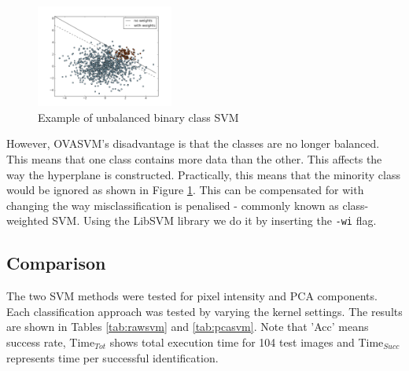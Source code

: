 \documentclass[10pt,twocolumn,letterpaper]{article}
\begin{document}
\begin{figure}[H]
\begin{center}
  
    \includegraphics[width=0.4\textwidth]{../results/SVM_unbalanced}

  \caption{Example of unbalanced binary class SVM \cite{SVM_unb}} \label{fig:SVM_un}
\end{center}
\end{figure}

However, OVASVM's disadvantage is that the classes are no longer balanced. This means that one class contains more data than the other. This affects the way the hyperplane is constructed. Practically, this means that the minority class would be ignored as shown in Figure \ref{fig:SVM_un}. This can be compensated for with changing the way misclassification is penalised - commonly known as class-weighted SVM. Using the LibSVM library we do it by inserting the {\tt\small -wi} flag.


\subsection{Comparison}

The two SVM methods were tested for pixel intensity and PCA components. Each classification approach was tested by varying the kernel settings. The results are shown in Tables \ref{tab:rawsvm} and \ref{tab:pcasvm}. Note that 'Acc' means success rate, Time$_{Tot}$ shows total execution time for 104 test images and Time$_{Succ}$ represents time per successful identification.
\end{document}
